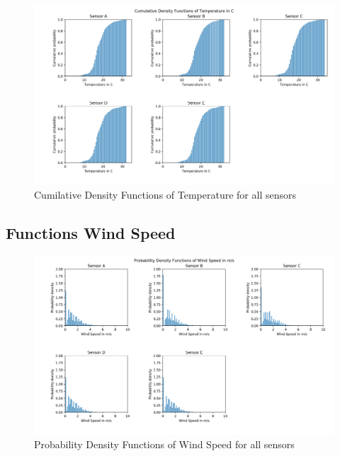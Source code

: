 \documentclass{article}
\begin{document}
            \begin{figure}
                \includegraphics[width=\textwidth]{cdf_temp}
                \caption{Cumilative Density Functions of Temperature for all sensors}
            \end{figure}

        \subsection{Functions Wind Speed}
            \begin{figure}
                \includegraphics[width=\textwidth]{pdf_windspeed}
                \caption{Probability Density Functions of Wind Speed for all sensors}
            \end{figure}
\end{document}
